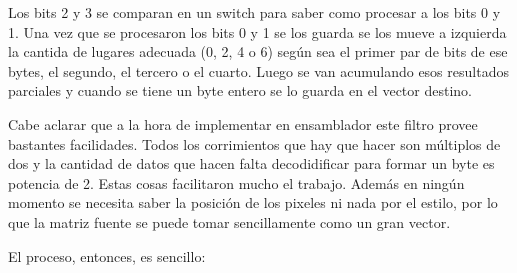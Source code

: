 	Los bits 2 y 3 se comparan en un switch para saber como procesar
a los bits 0 y 1. Una vez que se procesaron los bits 0 y 1 se los guarda se los
mueve a izquierda la cantida de lugares adecuada (0, 2, 4 o 6) según sea el primer
par de bits de ese bytes, el segundo, el tercero o el cuarto. Luego se van acumulando
esos resultados parciales y cuando se tiene un byte entero se lo guarda en el vector
destino.

	Cabe aclarar que a la hora de implementar en ensamblador este filtro provee bastantes
facilidades. Todos los corrimientos que hay que hacer son múltiplos de dos y la cantidad
de datos que hacen falta decodidificar para formar un byte es potencia de 2. Estas
cosas facilitaron mucho el trabajo. Además en ningún momento se necesita saber la
posición de los pixeles ni nada por el estilo, por lo que la matriz fuente se puede
tomar sencillamente como un gran vector.

	El proceso, entonces, es sencillo:

